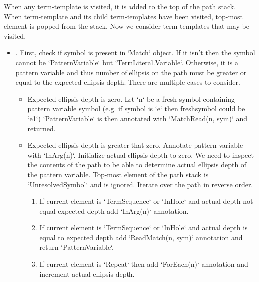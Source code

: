 When any term-template is visited, it is added to the top of the path stack. When term-template and its child term-templates have been visited, top-most element is popped from the stack. Now we consider term-templates that may be visited.
\begin{itemize}

\item
\TermUnresolvedSymbol. First, check if symbol is present in `Match` object. If it isn't then the symbol cannot be `PatternVariable` but `TermLiteral.Variable`. Otherwise, it is a pattern variable and thus number of ellipsis on the path must be greater or equal to the expected ellipsis depth. There are multiple cases to consider.
	\begin{itemize}
	\item
	Expected ellipsis depth is zero. Let `n` be a fresh symbol containing pattern variable symbol (e.g. if symbol is `e` then freshsymbol could be `e1`)  `PatternVariable` is then annotated with `MatchRead(n, sym)` and returned.
	\item
	Expected ellipsis depth is greater that zero. Annotate pattern variable with `InArg(n)`. Initialize actual ellipsis depth to zero. We need to inspect the contents of the path to be able to determine actual ellipsis depth of the pattern variable. Top-most element of the path stack is `UnresolvedSymbol` and is ignored. Iterate over the path in reverse order. 
		\begin{enumerate}
		\item
		If current element is `TermSequence` or `InHole` and actual depth not equal expected depth add `InArg(n)` annotation.
		\item
		If current element is `TermSequence` or `InHole` and actual depth is equal to expected depth add `ReadMatch(n, sym)` annotation and return `PatternVariable`.
		\item
		If current element is `Repeat` then add `ForEach(n)` annotation and increment actual ellipsis depth.
		\end{enumerate}


\end{itemize}
\end{itemize}
